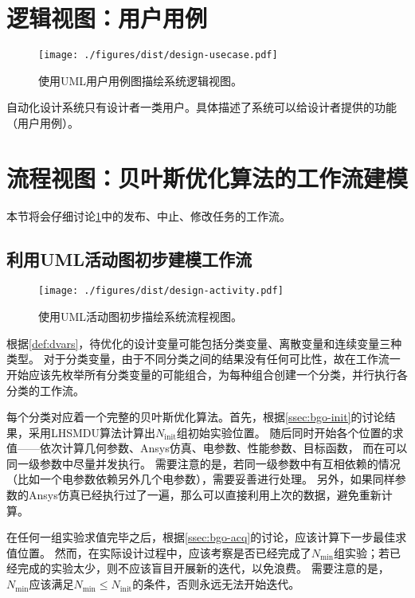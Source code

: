 \documentclass[index]{subfiles}
\begin{document}
\section{逻辑视图：用户用例}\label{sec:design-usecase}
\begin{figure}[h]
  \centering
  \texttt{[image: ./figures/dist/design-usecase.pdf]}
  \caption[系统逻辑视图]{使用UML用户用例图描绘系统逻辑视图。\label{fig:design-usecase}}
\end{figure}
自动化设计系统只有设计者一类用户。具体描述了系统可以给设计者提供的功能（用户用例）。

\section{流程视图：贝叶斯优化算法的工作流建模}\label{sec:design-wf}
本节将会仔细讨论\cref{fig:design-usecase}中的发布、中止、修改任务的工作流。

\subsection{利用UML活动图初步建模工作流}
\begin{figure}[h]
  \centering
  \texttt{[image: ./figures/dist/design-activity.pdf]}
  \caption[系统流程视图初步]{使用UML活动图初步描绘系统流程视图。\label{fig:design-activity}}
\end{figure}

根据\cref{def:dvars}，待优化的设计变量可能包括分类变量、离散变量和连续变量三种类型。
对于分类变量，由于不同分类之间的结果没有任何可比性，故在工作流一开始应该先枚举所有分类变量的可能组合，为每种组合创建一个分类，并行执行各分类的工作流。

每个分类对应着一个完整的贝叶斯优化算法。首先，根据\cref{ssec:bgo-init}的讨论结果，采用LHSMDU算法计算出$N_\mathrm{init}$组初始实验位置。
随后同时开始各个位置的求值——依次计算几何参数、Ansys仿真、电参数、性能参数、目标函数，
而在可以同一级参数中尽量并发执行。
需要注意的是，若同一级参数中有互相依赖的情况（比如一个电参数依赖另外几个电参数），需要妥善进行处理。
另外，如果同样参数的Ansys仿真已经执行过了一遍，那么可以直接利用上次的数据，避免重新计算。

在任何一组实验求值完毕之后，根据\cref{ssec:bgo-acq}的讨论，应该计算下一步最佳求值位置。
然而，在实际设计过程中，应该考察是否已经完成了$N_\mathrm{min}$组实验；若已经完成的实验太少，则不应该盲目开展新的迭代，以免浪费。
需要注意的是，$N_\mathrm{min}$应该满足$N_\mathrm{min} \leq N_\mathrm{init}$的条件，否则永远无法开始迭代。
\end{document}
